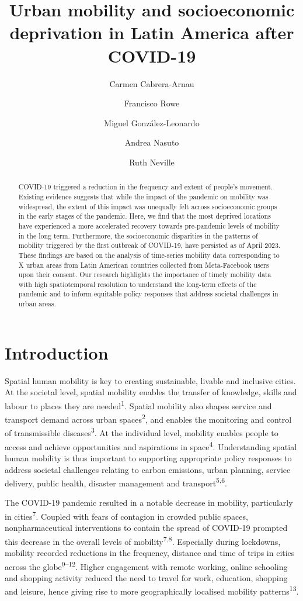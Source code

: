 \documentclass[
  11pt,
]{article}
\title{\textbf{Urban mobility and socioeconomic deprivation in Latin
America after COVID-19}}
\author[1]{Carmen Cabrera-Arnau}
\author[1]{Francisco Rowe}
\author[2]{Miguel González-Leonardo}
\author[1]{Andrea Nasuto}
\author[1]{Ruth Neville}
\affil[1]{Geographic Data Science Lab, Department of Geography and
Planning, University of Liverpool, Liverpool, UK}
\affil[2]{Centre for Demographic Urban and Environmental Studies, El
Colegio de México, Ciudad de México, México}
\date{}
\begin{document}
\maketitle
\begin{abstract}
COVID-19 triggered a reduction in the frequency and extent of people's
movement. Existing evidence suggests that while the impact of the
pandemic on mobility was widespread, the extent of this impact was
unequally felt across socioeconomic groups in the early stages of the
pandemic. Here, we find that the most deprived locations have
experienced a more accelerated recovery towards pre-pandemic levels of
mobility in the long term. Furthermore, the socioeconomic disparities in
the patterns of mobility triggered by the first outbreak of COVID-19,
have persisted as of April 2023. These findings are based on the
analysis of time-series mobility data corresponding to X urban areas
from Latin American countries collected from Meta-Facebook users upon
their consent. Our research highlights the importance of timely mobility
data with high spatiotemporal resolution to understand the long-term
effects of the pandemic and to inform equitable policy responses that
address societal challenges in urban areas.
\end{abstract}


\hfill\break

\section{Introduction}\label{sec-intro}

Spatial human mobility is key to creating sustainable, livable and
inclusive cities. At the societal level, spatial mobility enables the
transfer of knowledge, skills and labour to places they are
needed\textsuperscript{1}. Spatial mobility also shapes service and
transport demand across urban spaces\textsuperscript{2}, and enables the
monitoring and control of transmissible diseases\textsuperscript{3}. At
the individual level, mobility enables people to access and achieve
opportunities and aspirations in space\textsuperscript{4}. Understanding
spatial human mobility is thus important to supporting appropriate
policy responses to address societal challenges relating to carbon
emissions, urban planning, service delivery, public health, disaster
management and transport\textsuperscript{5,6}.

The COVID-19 pandemic resulted in a notable decrease in mobility,
particularly in cities\textsuperscript{7}. Coupled with fears of
contagion in crowded public spaces, nonpharmaceutical interventions to
contain the spread of COVID‐19 prompted this decrease in the overall
levels of mobility\textsuperscript{7,8}. Especially during lockdowns,
mobility recorded reductions in the frequency, distance and time of
trips in cities across the globe\textsuperscript{9--12}. Higher
engagement with remote working, online schooling and shopping activity
reduced the need to travel for work, education, shopping and leisure,
hence giving rise to more geographically localised mobility
patterns\textsuperscript{13}.
\end{document}
